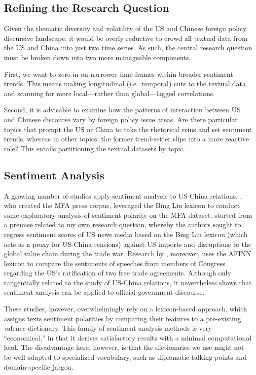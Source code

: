 \documentclass[12pt,letterpaper]{article}
\begin{document}
\subsection{Refining the Research Question}
\label{sec:refine}

Given the thematic diversity and volatility of the US and Chinese foreign policy discursive landscape, it would be overly reductive to crowd all textual data from the US and China into just two time series. As such, the central research question must be broken down into two more manageable components.

First, we want to zero in on narrower time frames within broader sentiment trends. This means making longitudinal (i.e.\ temporal) cuts to the textual data and scanning for more local---rather than global---lagged correlations.

Second, it is advisable to examine how the patterns of interaction between US and Chinese discourse vary by foreign policy issue areas. Are there particular topics that prompt the US or China to take the rhetorical reins and set sentiment trends, whereas in other topics, the former trend-setter slips into a more reactive role? This entails partitioning the textual datasets by topic.

\subsection{Sentiment Analysis}

A growing number of studies apply sentiment analysis to US-China relations. \Textcite{mochtak2021}, who created the MFA press corpus, leveraged the Bing Liu lexicon to conduct some exploratory analysis of sentiment polarity on the MFA dataset. \Textcite[403--406]{zeng2022} started from a premise related to my own research question, whereby the authors sought to regress sentiment scores of US news media based on the Bing Liu lexicon (which acts as a proxy for US-China tensions) against US imports and disruptions to the global value chain during the trade war. Research by \textcite{choi2023}, moreover, uses the AFINN lexicon to compare the sentiments of speeches from members of Congress regarding the US's ratification of two free trade agreements. Although only tangentially related to the study of US-China relations, it nevertheless shows that sentiment analysis can be applied to official government discourse.

These studies, however, overwhelmingly rely on a lexicon-based approach, which assigns texts sentiment polarities by comparing their features to a pre-existing valence dictionary. This family of sentiment analysis methods is very ``economical,'' in that it derives satisfactory results with a minimal computational load. The disadvantage here, however, is that the dictionaries we use might not be well-adapted to specialized vocabulary, such as diplomatic talking points and domain-specific jargon.
\end{document}
